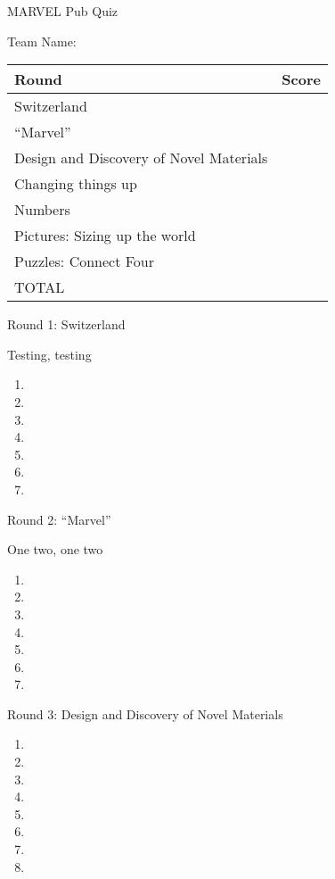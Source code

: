 

\centering
\Huge
MARVEL Pub Quiz
\vspace{2cm}

\LARGE
Team Name: \underline{\hphantom{XXXXXXXXXXXXXXXXXXXXXXXXXX}}

\vspace{3cm}

\LARGE
\begin{tabular}{ll}
\hline
Round & Score \\
\hline
Switzerland & \\
``Marvel'' & \\
Design and Discovery of Novel Materials & \\
Changing things up & \\
Numbers & \\
Pictures: Sizing up the world & \\
Puzzles: Connect Four & \\
TOTAL \\
\hline
\end{tabular}
\thispagestyle{empty}
\Huge
\newpage
\begin{center}
\Huge
Round 1: Switzerland
\end{center}
\large
Testing, testing

\Huge
\begin{enumerate}
\item
\item
\item
\item
\item
\item
\item
\end{enumerate}

\newpage
\begin{center}
\Huge
Round 2: ``Marvel''
\end{center}
\large
One two, one two

\Huge
\begin{enumerate}
\item
\item
\item
\item
\item
\item
\item
\end{enumerate}

\newpage
\begin{center}
\Huge
Round 3: Design and Discovery of Novel Materials
\end{center}
\large
\Huge
\begin{enumerate}
\item
\item
\item
\item
\item
\item
\item
\item
\end{enumerate}

